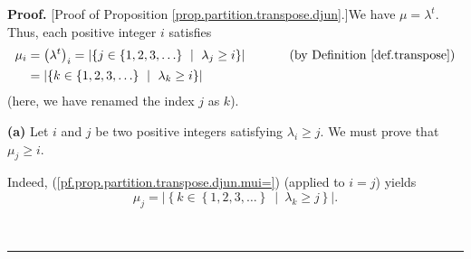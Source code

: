 \documentclass[numbers=enddot,12pt,final,onecolumn,notitlepage]{scrartcl}%
\theoremstyle{definition}
\newenvironment{proof}[1][Proof]{\noindent\textbf{#1.} }{\ \rule{0.5em}{0.5em}}
\newenvironment{verlong}{}{}
\begin{document}
\begin{verlong}
\begin{proof}
[Proof of Proposition \ref{prop.partition.transpose.djun}.]We have
$\mu=\lambda^{t}$. Thus, each positive integer $i$ satisfies%
\begin{align}
\mu_{i}  &  =\left(  \lambda^{t}\right)  _{i}=\left\vert \left\{  j\in\left\{
1,2,3,\ldots\right\}  \ \mid\ \lambda_{j}\geq i\right\}  \right\vert
\ \ \ \ \ \ \ \ \ \ \left(  \text{by Definition \ref{def.transpose}}\right)
\nonumber\\
&  =\left\vert \left\{  k\in\left\{  1,2,3,\ldots\right\}  \ \mid\ \lambda
_{k}\geq i\right\}  \right\vert \label{pf.prop.partition.transpose.djun.mui=}%
\end{align}
(here, we have renamed the index $j$ as $k$).

\textbf{(a)} Let $i$ and $j$ be two positive integers satisfying $\lambda
_{i}\geq j$. We must prove that $\mu_{j}\geq i$.

Indeed, (\ref{pf.prop.partition.transpose.djun.mui=}) (applied to $i=j$)
yields%
\begin{equation}
\mu_{j}=\left\vert \left\{  k\in\left\{  1,2,3,\ldots\right\}  \ \mid
\ \lambda_{k}\geq j\right\}  \right\vert .
\label{pf.prop.partition.transpose.djun.a.muj=}%
\end{equation}



\end{proof}
\end{verlong}
\end{document}
